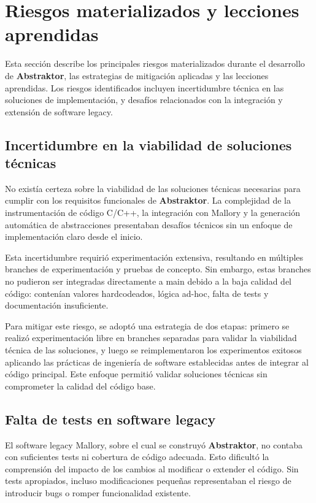 \documentclass[12pt]{article}
\begin{document}
\section{Riesgos materializados y lecciones aprendidas}

Esta sección describe los principales riesgos materializados durante el desarrollo de \textbf{Abstraktor}, las estrategias de mitigación aplicadas y las lecciones aprendidas. Los riesgos identificados incluyen incertidumbre técnica en las soluciones de implementación, y desafíos relacionados con la integración y extensión de software legacy.

\subsection{Incertidumbre en la viabilidad de soluciones técnicas}

No existía certeza sobre la viabilidad de las soluciones técnicas necesarias para cumplir con los requisitos funcionales de \textbf{Abstraktor}. La complejidad de la instrumentación de código C/C++, la integración con Mallory y la generación automática de abstracciones presentaban desafíos técnicos sin un enfoque de implementación claro desde el inicio.

Esta incertidumbre requirió experimentación extensiva, resultando en múltiples branches de experimentación y pruebas de concepto. Sin embargo, estas branches no pudieron ser integradas directamente a main debido a la baja calidad del código: contenían valores hardcodeados, lógica ad-hoc, falta de tests y documentación insuficiente.

Para mitigar este riesgo, se adoptó una estrategia de dos etapas: primero se realizó experimentación libre en branches separadas para validar la viabilidad técnica de las soluciones, y luego se reimplementaron los experimentos exitosos aplicando las prácticas de ingeniería de software establecidas antes de integrar al código principal. Este enfoque permitió validar soluciones técnicas sin comprometer la calidad del código base.

\subsection{Falta de tests en software legacy}

El software legacy Mallory, sobre el cual se construyó \textbf{Abstraktor}, no contaba con suficientes tests ni cobertura de código adecuada. Esto dificultó la comprensión del impacto de los cambios al modificar o extender el código. Sin tests apropiados, incluso modificaciones pequeñas representaban el riesgo de introducir bugs o romper funcionalidad existente.
\end{document}
